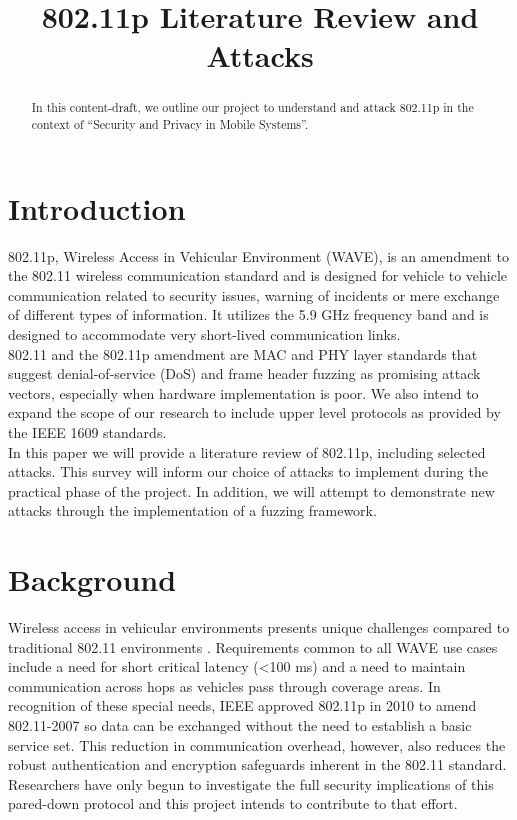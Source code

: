 \documentclass[conference]{IEEEtran}
\title{802.11p Literature Review and Attacks}
\author{\IEEEauthorblockN{Aniket Chaudhari and Alvin Cai and Wouter de Groot and Erik Schneider}
\IEEEauthorblockA{Technische Universiteit Eindhoven\\
Eindhoven, The Netherlands\\
\\
September 30, 2014}}
\begin{document}
\maketitle

\begin{abstract}
In this content-draft, we outline our project to understand and attack 802.11p in the context of “Security and Privacy in Mobile Systems”.
\end{abstract}

\section{Introduction}
802.11p, Wireless Access in Vehicular Environment (WAVE), is an amendment to the 802.11 wireless communication standard and is designed for vehicle to vehicle communication related to security issues, warning of incidents or mere exchange of different types of information. It utilizes the 5.9 GHz frequency band and is designed to accommodate very short-lived communication links.\\

802.11 and the 802.11p amendment are MAC and PHY layer standards that suggest denial-of-service (DoS) and frame header fuzzing as promising attack vectors, especially when hardware implementation is poor. We also intend to expand the scope of our research to include upper level protocols as provided by the IEEE 1609 standards.\\

In this paper we will provide a literature review of 802.11p, including selected attacks. This survey will inform our choice of attacks to implement during the practical phase of the project. In addition, we will attempt to demonstrate new attacks through the implementation of a fuzzing framework.

\section{Background}

Wireless access in vehicular environments presents unique challenges compared to traditional 802.11 environments \cite{karagiannis2011vehicular}. Requirements common to all WAVE use cases include a need for short critical latency (\textless 100 ms) and a need to maintain communication across hops as vehicles pass through coverage areas. In recognition of these special needs, IEEE approved 802.11p in 2010 to amend 802.11-2007 \cite{ieee11802} so data can be exchanged without the need to establish a basic service set. This reduction in communication overhead, however, also reduces the robust authentication and encryption safeguards inherent in the 802.11 standard. Researchers have only begun to investigate the full security implications of this pared-down protocol and this project intends to contribute to that effort.\\
\end{document}
